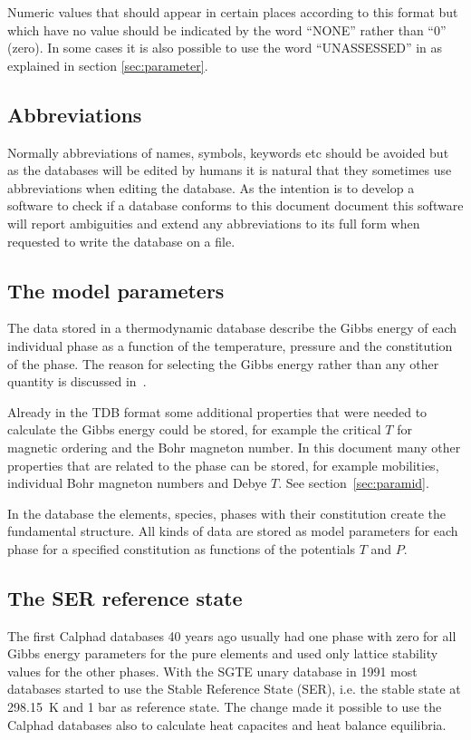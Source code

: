 \documentclass[12pt]{article}
\begin{document}
Numeric values that should appear in certain places according to this
format but which have no value should be indicated by the word
``NONE'' rather than ``0'' (zero).  In some cases it is also possible
to use the word ``UNASSESSED'' in as explained in section
\ref{sec:parameter}.

\subsection{Abbreviations}

Normally abbreviations of names, symbols, keywords etc should be
avoided but as the databases will be edited by humans it is natural
that they sometimes use abbreviations when editing the database.  As
the intention is to develop a software to check if a database conforms
to this document document this software will report ambiguities and
extend any abbreviations to its full form when requested to write the
database on a file.

\subsection{The model parameters}

The data stored in a thermodynamic database describe the Gibbs energy
of each individual phase as a function of the temperature, pressure
and the constitution of the phase.  The reason for selecting the Gibbs
energy rather than any other quantity is discussed in~\cite{78Hil}.

Already in the TDB format some additional properties that were needed
to calculate the Gibbs energy could be stored, for example the
critical $T$ for magnetic ordering and the Bohr magneton number.  In
this document many other properties that are related to the phase can
be stored, for example mobilities, individual Bohr magneton numbers
and Debye $T$.  See section~\ref{sec:paramid}.

In the database the elements, species, phases with their constitution
create the fundamental structure.  All kinds of data are stored as
model parameters for each phase for a specified constitution as
functions of the potentials $T$ and $P$.

\subsection{The SER reference state}

The first Calphad databases 40 years ago usually had one phase with
zero for all Gibbs energy parameters for the pure elements and used
only lattice stability values for the other phases.  With the SGTE
unary database in 1991 most databases started to use the Stable
Reference State (SER), i.e. the stable state at 298.15~K and 1 bar as
reference state.  The change made it possible to use the Calphad
databases also to calculate heat capacites and heat balance
equilibria.
\end{document}
